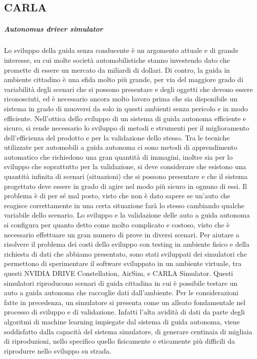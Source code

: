 \documentclass[14pt]{extarticle}
\begin{document}
\subsection{CARLA}
\subparagraph{Autonomus driver simulator}
Lo sviluppo della guida senza conducente è un argomento attuale e di
grande interesse, su cui molte società automobilistiche stanno investendo
dato che promette di essere un mercato da miliardi di dollari. %
Di contro, la guida in ambiente cittadino è una sfida
molto più grande, per via del maggiore grado di variabilità degli scenari
che si possono presentare e degli oggetti che devono essere riconosciuti,
ed è necessario ancora molto lavoro prima che sia disponibile un sistema
in grado di muoversi da solo in questi ambienti senza pericolo e in modo
efficiente.
Nell'ottica dello sviluppo di un sistema di guida autonoma efficiente
e sicuro, si rende necessario lo sviluppo di metodi e strumenti per il
miglioramento dell'efficienza del prodotto e per la validazione dello
stesso. Tra le tecniche utilizzate per automobili a guida autonoma ci sono
metodi di apprendimento automatico che richiedono una gran quantità di
immagini, inoltre sia per lo sviluppo che soprattutto per la validazione, si
deve considerare che esistono una quantità infinita di scenari (situazioni)
che si possono presentare e che il sistema progettato deve essere in grado
di agire nel modo più sicuro in ognuno di essi. Il problema è di per sé mal
posto, visto che non è dato sapere se un'auto che reagisce correttamente
in una certa situazione farà lo stesso cambiando qualche variabile dello
scenario.
Lo sviluppo e la validazione delle auto a guida autonoma si configura
per quanto detto come molto complicato e costoso, visto che è necessario
effettuare un gran numero di prove in diversi scenari.
Per aiutare a risolvere il problema dei costi dello sviluppo con testing
in ambiente fisico e della richiesta di dati che abbiamo presentato, sono
stati sviluppati dei simulatori che permettono di sperimentare il software
sviluppato in un ambiente virtuale, tra questi NVIDIA DRIVE Constellation, AirSim, e CARLA Simulator. Questi simulatori riproducono scenari di guida cittadina
in cui è possibile testare un auto a guida autonoma che raccoglie dati
dall'ambiente. Per le considerazioni fatte in precedenza, un simulatore
si presenta come un alleato fondamentale nel processo di sviluppo e di
validazione. Infatti l'alta avidità di dati da parte degli algoritmi di machine learning impiegate dal sistema di guida autonoma, viene soddisfatto dalla capacità del sistema simulatore, di generare centinaia di migliaia di riproduzioni, nello specifico quello fisicamente e eticamente più difficili da riprodurre nello sviluppo su strada.
\end{document}
